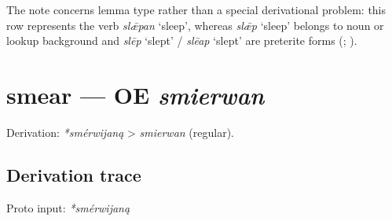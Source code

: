 \documentclass[
  british,
  a4paper,
  openany]{book}
\providecommand{\texorpdfstring}[2]{#1}
\begin{document}
The note concerns lemma type rather than a special derivational problem:
this row represents the verb \emph{slǣpan} `sleep', whereas \emph{slǣp}
`sleep' belongs to noun or lookup background and \emph{slēp} `slept' /
\emph{slēap} `slept' are preterite forms
(;
).

\section{\texorpdfstring{smear --- OE
\emph{smierwan}}{smear --- OE smierwan}}\label{smear-oe-smierwan}


Derivation: \emph{*smérwijaną} \textgreater{} \emph{smierwan} (regular).

\subsection{Derivation trace}\label{derivation-trace-47}

Proto input: \emph{*smérwijaną}

\begingroup
\setlength{\fboxsep}{6pt}
\end{document}
